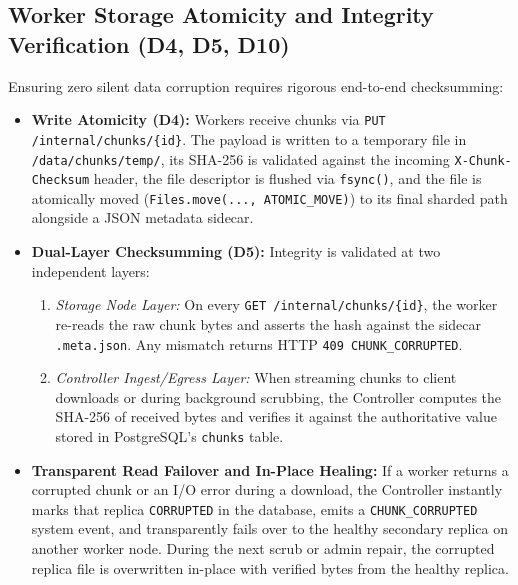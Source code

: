 \documentclass[12pt,a4paper]{report}
\begin{document}
\subsection{Worker Storage Atomicity and Integrity Verification (D4, D5, D10)}
Ensuring zero silent data corruption requires rigorous end-to-end checksumming:
\begin{itemize}[leftmargin=*]
  \item \textbf{Write Atomicity (D4):} Workers receive chunks via \texttt{PUT /internal/chunks/\{id\}}. The payload is written to a temporary file in \texttt{/data/chunks/temp/}, its SHA-256 is validated against the incoming \texttt{X-Chunk-Checksum} header, the file descriptor is flushed via \texttt{fsync()}, and the file is atomically moved (\texttt{Files.move(..., ATOMIC\_MOVE)}) to its final sharded path alongside a JSON metadata sidecar.
  \item \textbf{Dual-Layer Checksumming (D5):} Integrity is validated at two independent layers:
    \begin{enumerate}
      \item \textit{Storage Node Layer:} On every \texttt{GET /internal/chunks/\{id\}}, the worker re-reads the raw chunk bytes and asserts the hash against the sidecar \texttt{.meta.json}. Any mismatch returns HTTP \texttt{409 CHUNK\_CORRUPTED}.
      \item \textit{Controller Ingest/Egress Layer:} When streaming chunks to client downloads or during background scrubbing, the Controller computes the SHA-256 of received bytes and verifies it against the authoritative value stored in PostgreSQL's \texttt{chunks} table.
    \end{enumerate}
  \item \textbf{Transparent Read Failover and In-Place Healing:} If a worker returns a corrupted chunk or an I/O error during a download, the Controller instantly marks that replica \texttt{CORRUPTED} in the database, emits a \texttt{CHUNK\_CORRUPTED} system event, and transparently fails over to the healthy secondary replica on another worker node. During the next scrub or admin repair, the corrupted replica file is overwritten in-place with verified bytes from the healthy replica.
\end{itemize}
\end{document}
